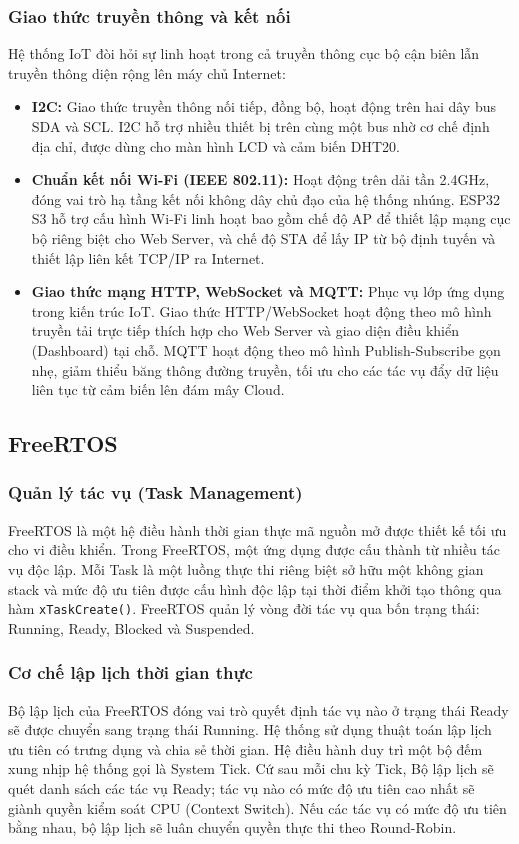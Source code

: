 \subsubsection{Giao thức truyền thông và kết nối}
Hệ thống IoT đòi hỏi sự linh hoạt trong cả truyền thông cục bộ cận biên lẫn truyền thông diện rộng lên máy chủ Internet:
\begin{itemize}
    \item \textbf{I2C:} Giao thức truyền thông nối tiếp, đồng bộ, hoạt động trên hai dây bus SDA và SCL. I2C hỗ trợ nhiều thiết bị trên cùng một bus nhờ cơ chế định địa chỉ, được dùng cho màn hình LCD và cảm biến DHT20.
    \item \textbf{Chuẩn kết nối Wi-Fi (IEEE 802.11):} Hoạt động trên dải tần 2.4GHz, đóng vai trò hạ tầng kết nối không dây chủ đạo của hệ thống nhúng. ESP32 S3 hỗ trợ cấu hình Wi-Fi linh hoạt bao gồm chế độ AP để thiết lập mạng cục bộ riêng biệt cho Web Server, và chế độ STA để lấy IP từ bộ định tuyến và thiết lập liên kết TCP/IP ra Internet.
    \item \textbf{Giao thức mạng HTTP, WebSocket và MQTT:} Phục vụ lớp ứng dụng trong kiến trúc IoT. Giao thức HTTP/WebSocket hoạt động theo mô hình truyền tải trực tiếp thích hợp cho Web Server và giao diện điều khiển (Dashboard) tại chỗ. MQTT hoạt động theo mô hình Publish-Subscribe gọn nhẹ, giảm thiểu băng thông đường truyền, tối ưu cho các tác vụ đẩy dữ liệu liên tục từ cảm biến lên đám mây Cloud.
\end{itemize}

\subsection{FreeRTOS}

\subsubsection{Quản lý tác vụ (Task Management)}
FreeRTOS là một hệ điều hành thời gian thực mã nguồn mở được thiết kế tối ưu cho vi điều khiển. Trong FreeRTOS, một ứng dụng được cấu thành từ nhiều tác vụ độc lập. Mỗi Task là một luồng thực thi riêng biệt sở hữu một không gian stack và mức độ ưu tiên được cấu hình độc lập tại thời điểm khởi tạo thông qua hàm \texttt{xTaskCreate()}. FreeRTOS quản lý vòng đời tác vụ qua bốn trạng thái: Running, Ready, Blocked và Suspended.

\subsubsection{Cơ chế lập lịch thời gian thực}
Bộ lập lịch của FreeRTOS đóng vai trò quyết định tác vụ nào ở trạng thái Ready sẽ được chuyển sang trạng thái Running. Hệ thống sử dụng thuật toán lập lịch ưu tiên có trưng dụng và chia sẻ thời gian. Hệ điều hành duy trì một bộ đếm xung nhịp hệ thống gọi là System Tick. Cứ sau mỗi chu kỳ Tick, Bộ lập lịch sẽ quét danh sách các tác vụ Ready; tác vụ nào có mức độ ưu tiên cao nhất sẽ giành quyền kiểm soát CPU (Context Switch). Nếu các tác vụ có mức độ ưu tiên bằng nhau, bộ lập lịch sẽ luân chuyển quyền thực thi theo Round-Robin.

